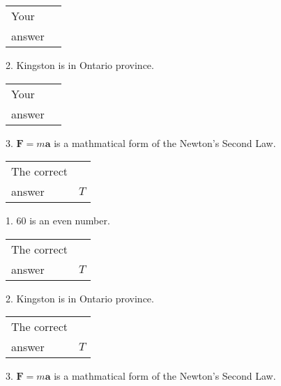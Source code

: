 \documentclass[12pt]{article}
\begin{document}
\noindent\begin{tabular}{|l|l|}\hline Your&\hspace{.2in} \\ answer&\hspace{.2in} \\ \hline \end{tabular}
2.  %
Kingston is in  %
Ontario province.
 
\noindent\begin{tabular}{|l|l|}\hline Your&\hspace{.2in} \\ answer&\hspace{.2in} \\ \hline \end{tabular}
3.  %
$\mathbf{F}=m\mathbf{a}$ is a mathmatical form of
the Newton's Second Law.
 
 
 
\noindent{}
 
 

 
\noindent\begin{tabular}{|l|l|}\hline The correct & \\
          answer &  %
$T$ \\ \hline \end{tabular}
1. $ %
60$ is an  %
even number.
 
\noindent\begin{tabular}{|l|l|}\hline The correct & \\
          answer &  %
$T$ \\ \hline \end{tabular}
2.  %
Kingston is in  %
Ontario province.
 
\noindent\begin{tabular}{|l|l|}\hline The correct & \\
          answer &  %
$T$ \\ \hline \end{tabular}
3.  %
$\mathbf{F}=m\mathbf{a}$ is a mathmatical form of  %
the Newton's Second Law.
 
 
 
\noindent{}
 
 

 
\vspace{0.3in}
   
   
   
\end{document}
